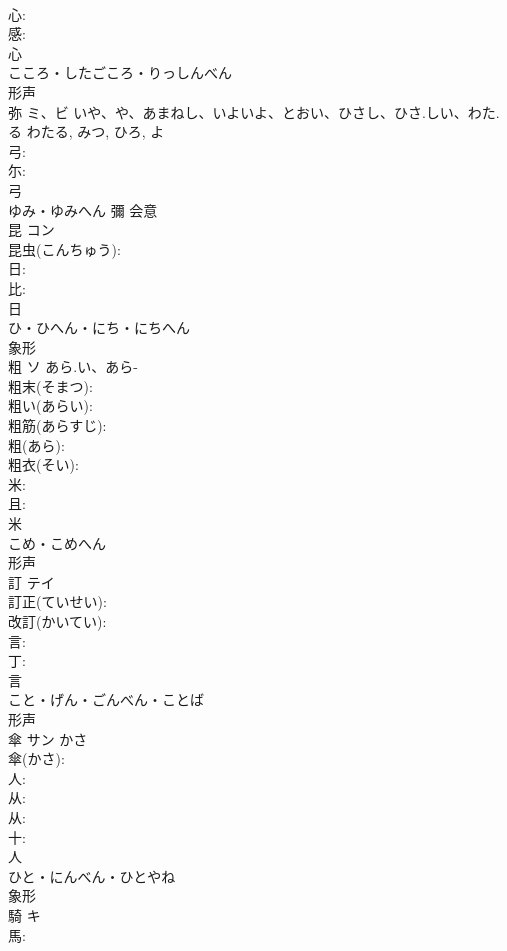 \documentclass[8pt]{extreport}
\begin{document}
\begin{CJK}{UTF8}{min}
\\	心: 
\\	感: 
\\	心	
\\	こころ・したごころ・りっしんべん	
\\	形声 
\\	弥	ミ、ビ	いや、や、あまねし、いよいよ、とおい、ひさし、ひさ.しい、わた.る	わたる, みつ, ひろ, よ	
\\	弓: 
\\	尓: 
\\	弓	
\\	ゆみ・ゆみへん	彌	会意 
\\	昆	コン			
\\	昆虫(こんちゅう): 
\\	日: 
\\	比: 
\\	日	
\\	ひ・ひへん・にち・にちへん	
\\	象形 
\\	粗	ソ	あら.い、あら-		
\\	粗末(そまつ): 
\\	粗い(あらい): 
\\	粗筋(あらすじ): 
\\	粗(あら): 
\\	粗衣(そい): 
\\	米: 
\\	且: 
\\	米	
\\	こめ・こめへん	
\\	形声 
\\	訂	テイ			
\\	訂正(ていせい): 
\\	改訂(かいてい): 
\\	言: 
\\	丁: 
\\	言	
\\	こと・げん・ごんべん・ことば	
\\	形声 
\\	傘	サン	かさ		
\\	傘(かさ): 
\\	人: 
\\	从: 
\\	从: 
\\	十: 
\\	人	
\\	ひと・にんべん・ひとやね	
\\	象形 
\\	騎	キ			
\\	馬: 

\end{CJK}
\end{document}

